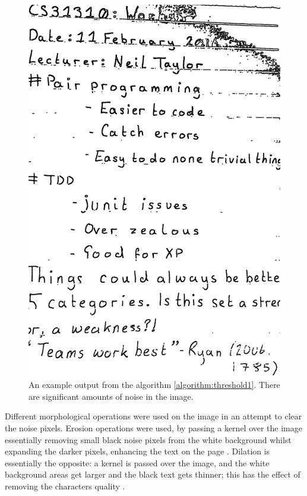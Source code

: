 \begin{figure}[H]
  \centering
  \includegraphics[scale=0.5]{images/removed_lines_still_noise}
  \caption{An example output from the algorithm \ref{algorithm:threshold1}. There are significant amounts of noise in the image.}
  \label{fig:remove_lines_noise}
\end{figure}

Different morphological operations were used on the image in an attempt to clear the noise pixels. Erosion operations were used, by passing a kernel over the image essentially removing small black noise pixels from the white background whilst expanding the darker pixels, enhancing the text on the page \cite{citeulike:14024957}. Dilation is essentially the opposite: a kernel is passed over the image, and the white background areas get larger and the black text gets thinner; this has the effect of removing the characters quality \cite{citeulike:14024957}.

